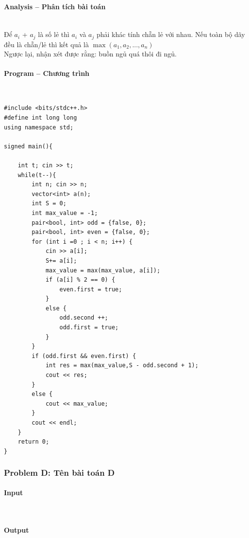 \documentclass{article}
\begin{document}
\paragraph{Analysis -- Phân tích bài toán} \mbox{} \\

Để $a_i$ + $a_j$ là số lẻ thì $a_i$ và $a_j$ phải khác tính chẵn lẻ với nhau. Nếu toàn bộ dãy đều là chẵn/lẻ thì kết quả là $\max{(a_1, a_2, ..., a_n)}$\\

Ngược lại, nhận xét được rằng: buồn ngủ quá thôi đi ngủ.

\paragraph{Program -- Chương trình} \mbox{} \\

\begin{lstlisting}
#include <bits/stdc++.h>
#define int long long
using namespace std;

signed main(){

	int t; cin >> t;
	while(t--){
		int n; cin >> n;
		vector<int> a(n);
		int S = 0;
		int max_value = -1;
		pair<bool, int> odd = {false, 0};
		pair<bool, int> even = {false, 0};
		for (int i =0 ; i < n; i++) {
			cin >> a[i];
			S+= a[i];
			max_value = max(max_value, a[i]);
			if (a[i] % 2 == 0) {
				even.first = true;
			}
			else {
				odd.second ++;
				odd.first = true;
			}
		}
		if (odd.first && even.first) {
			int res = max(max_value,S - odd.second + 1);
			cout << res;
		}
		else {
			cout << max_value;
		}
		cout << endl;
	}
	return 0;
}
\end{lstlisting}

\subsubsection{Problem D: Tên bài toán D}

\paragraph{Input} \mbox{} \\



\paragraph{Output}\mbox{} \\
\end{document}
